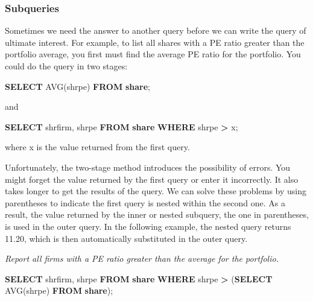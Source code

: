 \documentclass[
]{article}
\newenvironment{Shaded}{\begin{snugshade}}{\end{snugshade}}
\newcommand{\FunctionTok}[1]{\textcolor[rgb]{0.00,0.00,0.00}{#1}}
\newcommand{\KeywordTok}[1]{\textcolor[rgb]{0.13,0.29,0.53}{\textbf{#1}}}
\newcommand{\NormalTok}[1]{#1}
\newcommand{\OperatorTok}[1]{\textcolor[rgb]{0.81,0.36,0.00}{\textbf{#1}}}
\begin{document}
\hypertarget{subqueries}{%
\subsubsection{Subqueries}\label{subqueries}}

Sometimes we need the answer to another query before we can write the
query of ultimate interest. For example, to list all shares with a PE
ratio greater than the portfolio average, you first must find the
average PE ratio for the portfolio. You could do the query in two
stages:

\begin{Shaded}
\begin{Highlighting}[]
\KeywordTok{SELECT} \FunctionTok{AVG}\NormalTok{(shrpe) }\KeywordTok{FROM} \KeywordTok{share}\NormalTok{;}
\end{Highlighting}
\end{Shaded}

and

\begin{Shaded}
\begin{Highlighting}[]
\KeywordTok{SELECT}\NormalTok{ shrfirm, shrpe }\KeywordTok{FROM} \KeywordTok{share} \KeywordTok{WHERE}\NormalTok{ shrpe }\OperatorTok{\textgreater{}}\NormalTok{ x;}
\end{Highlighting}
\end{Shaded}

where x is the value returned from the first query.

Unfortunately, the two-stage method introduces the possibility of
errors. You might forget the value returned by the first query or enter
it incorrectly. It also takes longer to get the results of the query. We
can solve these problems by using parentheses to indicate the first
query is nested within the second one. As a result, the value returned
by the inner or nested subquery, the one in parentheses, is used in the
outer query. In the following example, the nested query returns 11.20,
which is then automatically substituted in the outer query.

\emph{Report all firms with a PE ratio greater than the average for the
portfolio.}

\begin{Shaded}
\begin{Highlighting}[]
\KeywordTok{SELECT}\NormalTok{ shrfirm, shrpe }\KeywordTok{FROM} \KeywordTok{share}
  \KeywordTok{WHERE}\NormalTok{ shrpe }\OperatorTok{\textgreater{}}\NormalTok{ (}\KeywordTok{SELECT} \FunctionTok{AVG}\NormalTok{(shrpe) }\KeywordTok{FROM} \KeywordTok{share}\NormalTok{);}
\end{Highlighting}
\end{Shaded}
\end{document}
